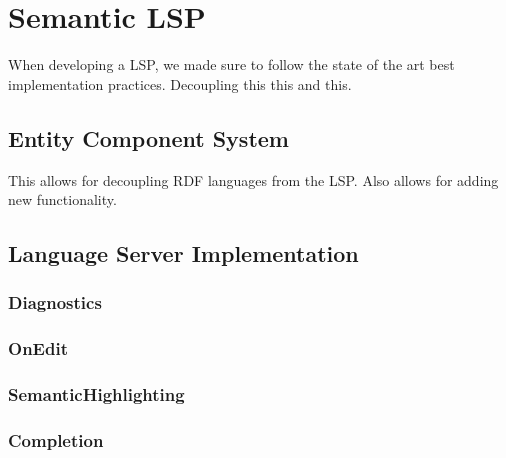 \section{Semantic LSP}%
\label{sec:semantic_lsp}

When developing a LSP, we made sure to follow the state of the art best implementation practices\cite{lspImplementationPractices}.
Decoupling this this and this.

\subsection{Entity Component System}

This allows for decoupling RDF languages from the LSP.
Also allows for adding new functionality.


\subsection{Language Server Implementation}

\subsubsection*{Diagnostics}

\subsubsection*{OnEdit}

\subsubsection*{SemanticHighlighting}

\subsubsection*{Completion}


